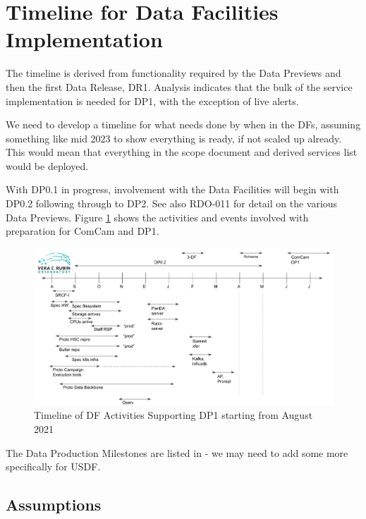 
\section{Timeline for Data Facilities Implementation}\label{sec:timeline}

The timeline is derived from functionality required by the Data
Previews and then the first Data \gls{Release}, DR1. Analysis indicates that
the bulk of the service implementation is needed for \gls{DP1}, with the
exception of live alerts.

We need to develop a timeline for what needs done by when in the DFs, assuming something like mid 2023 to show everything is ready, if not scaled up already.
This would mean that everything in the scope document and derived services list would be deployed.

With \gls{DP0}.1 in progress, involvement with the Data Facilities will
begin with \gls{DP0}.2  following through to \gls{DP2}.
See also \gls{RDO}-011 for detail on the various Data Previews. Figure
\ref{timeline} shows the activities and events involved with
preparation for ComCam and DP1.

\begin{figure}
\includegraphics[width=\textwidth]{USDF-DP1_Timeline.jpg}
\caption{Timeline of DF Activities Supporting DP1 starting from August
2021}
\label{timeline}
\end{figure}

The Data Production Milestones are listed in  - we may need to add some more specifically for \gls{USDF}.


\subsection{Assumptions}


